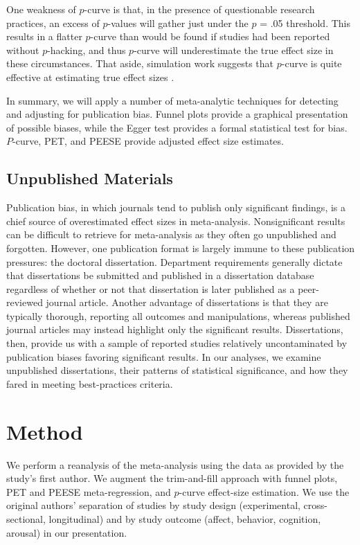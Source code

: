\documentclass[man]{apa6}
\begin{document}
One weakness of $p$-curve is that, in the presence of questionable research practices, an excess of $p$-values will gather just under the $p$ = .05 threshold. This results in a flatter $p$-curve than would be found if studies had been reported without $p$-hacking, and thus $p$-curve will underestimate the true effect size in these circumstances. That aside, simulation work suggests that $p$-curve is quite effective at estimating true effect sizes \citep{Simonsohn:etal:2014,Simonsohn:etal:2014b}.

In summary, we will apply a number of meta-analytic techniques for detecting and adjusting for publication bias. Funnel plots provide a graphical presentation of possible biases, while the Egger test provides a formal statistical test for bias. $P$-curve, PET, and PEESE provide adjusted effect size estimates.

\subsection{Unpublished Materials}
Publication bias, in which journals tend to publish only significant findings, is a chief source of overestimated effect sizes in meta-analysis. Nonsignificant results can be difficult to retrieve for meta-analysis as they often go unpublished and forgotten. However, one publication format is largely immune to these publication pressures: the doctoral dissertation. Department requirements generally dictate that dissertations be submitted and published in a dissertation database regardless of whether or not that dissertation is later published as a peer-reviewed journal article.  Another advantage of dissertations is that they are typically thorough, reporting all outcomes and manipulations, whereas published journal articles may instead highlight only the significant results.  Dissertations, then, provide us with a sample of reported studies relatively uncontaminated by publication biases favoring significant results. In our analyses, we examine unpublished dissertations, their patterns of statistical significance, and how they fared in meeting best-practices criteria.

\section{Method}
We perform a reanalysis of the \citet{Anderson:etal:2010} meta-analysis using the data as provided by the study's first author.  We augment the trim-and-fill approach with funnel plots, PET and PEESE meta-regression, and $p$-curve effect-size estimation. We use the original authors' separation of studies by study design (experimental, cross-sectional, longitudinal) and by study outcome (affect, behavior, cognition, arousal) in our presentation.
\end{document}
